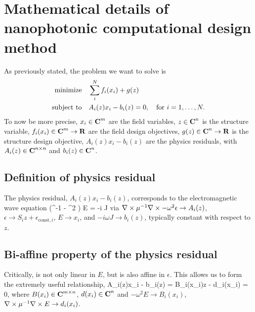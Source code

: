 \renewcommand{\EE}[2]{\begin{subequations}\begin{align}#2\end{align}\label{eq:#1}\end{subequations}}
\chapter{Mathematical details of nanophotonic computational design method} 
\label{maths}
As previously stated, the problem we want to solve is 
    \EE {rigorous problem statement}
        {\minimize&  \sum_i^N f_i(x_i) + g(z) \\
        \subto&     A_i(z)x_i - b_i(z) = 0,\quad\text{for $i = 1, \ldots, N.$}}
To now be more precise,
    \BI $x_i \in {\mbox{\bf C}}^m$ are the field variables,
    \I  $z \in {\mbox{\bf C}}^n$ is the structure variable,
    \I  $f_i(x_i) \in {\mbox{\bf C}}^m \to {\mbox{\bf R}}$ are the field design objectives,
    \I  $g(z) \in {\mbox{\bf C}}^n \to {\mbox{\bf R}}$ is the structure design objective,
    \I  $A_i(z)x_i - b_i(z)$ are the physics residuals, with
    \I  $A_i(z) \in {\mbox{\bf C}}^{n \times n}$ and
    \I  $b_i(z) \in {\mbox{\bf C}}^n$. \EI

\section{Definition of physics residual}
The physics residual, $A_i(z)x_i - b_i(z)$, 
    corresponds to the electromagnetic wave equation
        {(\curl \mu^{-1} \curl - \omega^2 \epsilon) E = -i \omega J}
        via
    \BI $\nabla\times \mu^{-1} \nabla\times - \omega^2 \epsilon \to A_i(z)$, %
    \I  $\epsilon \to S_i z + \epsilon_{\text{const}, i}$,
    \I  $E \to x_i$, and
    \I  $-i \omega J \to b_i(z)$, typically constant with respect to $z$. \EI

\section{Bi-affine property of the physics residual}
Critically,  is not only linear in $E$,
    but is also affine in $\epsilon$.
This allows us to form the extremely useful relationship,
        {A_i(z)x_i - b_i(z) = B_i(x_i)z - d_i(x_i) = 0,}
    where $B(x_i) \in {\mbox{\bf C}}^{m \times n}$, $d(x_i) \in {\mbox{\bf C}}^n$ and
    \BI  $-\omega^2 E \to B_i(x_i)$, 
    \I  $\nabla\times \mu^{-1} \nabla\times E \to d_i(x_i)$. \EI

